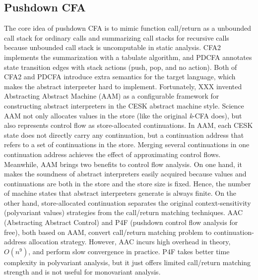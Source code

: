 \documentclass{article}
\begin{document}
\subsection{Pushdown CFA}
The core idea of pushdown CFA is to mimic function call/return as a unbounded call stack for ordinary calls and summarizing call stacks for recursive calls because unbounded call stack is uncomputable in static analysis.
CFA2 %
implements the summarization with a tabulate algorithm, %
and PDCFA %
annotates state transition edges with stack actions (push, pop, and no action).
Both of CFA2 and PDCFA introduce extra semantics for the target language, which makes the abstract interpreter hard to implement.
Fortunately, XXX %
invented Abstracting Abstract Machine (AAM) %
as a configurable framework for constructing abstract interpreters in the CESK abstract machine style. %
Science AAM not only allocates values in the store (like the original \textit{k}-CFA does), but also represents control flow as store-allocated continuations.
In AAM, each CESK state does not directly carry any continuation, but a continuation address that refers to a set of continuations in the store.
Merging several continuations in one continuation address achieves the effect of approximating control flows.
Meanwhile, AAM brings two benefits to control flow analysis.
On one hand, it makes the soundness of abstract interpreters easily acquired because values and continuations are both in the store and
the store size is fixed.
Hence, the number of machine states that abstract interpreters generate is always finite.
On the other hand, store-allocated continuation separates the original context-sensitivity (polyvariant values) strategies from
the call/return matching techniques.
AAC (Abstracting Abstract Control) and P4F (pushdown control flow analysis for free), %
both based on AAM, convert call/return matching problem to continuation-address allocation strategy.
However, AAC incurs high overhead in theory, $O(n^9)$, and perform slow convergence in practice. %
P4F takes better time complexity in polyvariant analysis, but it just offers limited call/return matching strength and is not useful for monovariant analysis.
\end{document}
